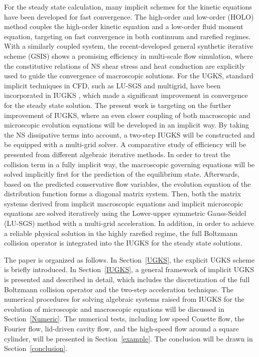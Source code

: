 \documentclass[3p,12pt]{elsarticle}
\begin{document}
	
	For the steady state calculation, many implicit schemes for the kinetic equations have been developed for fast convergence.
	The high-order and low-order (HOLO) method \cite{taitano2014moment, chacon2017multiscale} couples the high-order kinetic equation and a low-order fluid moment equation, targeting on fast convergence in both continuum and rarefied regimes.
	With a similarly coupled system, the recent-developed general synthetic iterative scheme (GSIS) \cite{su2020can, zhu2021general} shows a promising efficiency in multi-scale flow simulation, where the constitutive relations of NS shear stress and heat conduction are explicitly used
	to guide the convergence of macroscopic solutions.
	For the UGKS, standard implicit techniques in CFD, such as LU-SGS and multigrid, have been incorporated in IUGKS \cite{zhu2016implicit, zhu2017unified, zhu2019implicit}, which made a significant improvement in convergence for the steady state solution.
	The present work is targeting on the further improvement of IUGKS, where an even closer coupling of both macroscopic and microscopic evolution equations will be developed in an implicit way. 
By taking the NS dissipative terms into account, a two-step IUGKS will be constructed and be equipped with a multi-grid solver. 
A comparative study of  efficiency will be presented from different  algebraic iterative methods.
	In order to treat the collision term in a fully implicit way, the macroscopic governing equations will be solved implicitly first for the prediction of the equilibrium state. Afterwards, based on the predicted conservative flow variables, the evolution equation of the distribution function forms a diagonal matrix system. 
	Then, both the matrix systems derived from implicit macroscopic equations and implicit microscopic equations are solved iteratively using the Lower-upper symmetric Gauss-Seidel (LU-SGS) method with a multi-grid acceleration.
	In addition, in order to achieve a reliable physical solution in the highly rarefied regime, the full Boltzmann collision operator is integrated into the IUGKS for the steady state solutions. 
	
	The paper is organized as follows. In Section~\ref{UGKS}, the explicit UGKS scheme is briefly introduced.
	In Section~\ref{IUGKS}, a general framework of implicit UGKS is presented and described in detail, which includes
	the discretization of the full Boltzmann collision operator and the two-step acceleration technique.
	The numerical procedures for solving algebraic systems raised from IUGKS for the evolution of microscopic and macroscopic equations
	will be discussed in Section~\ref{Numeric}. The numerical tests, including low speed Couette flow, the Fourier flow, lid-driven cavity flow, and the high-speed flow around a square cylinder, will be presented in Section~\ref{example}.
	The conclusion will be drawn in Section~\ref{conclusion}.
	
\end{document}

